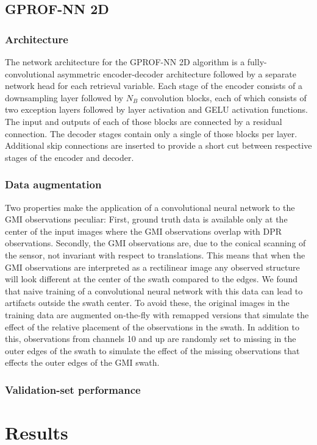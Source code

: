 \documentclass[a4paper,11pt,bibtotoc]{scrartcl}
\begin{document}
\subsection{GPROF-NN 2D}

\subsubsection{Architecture}

The network architecture for the GPROF-NN 2D algorithm is a fully-convolutional
asymmetric encoder-decoder architecture followed by a separate network head for
each retrieval variable. Each stage of the encoder consists of a downsampling
layer followed by $N_B$ convolution blocks, each of which consists of two
exception layers followed by layer activation and GELU activation functions. The
input and outputs of each of those blocks are connected by a residual
connection. The decoder stages contain only a single of those blocks per layer.
Additional skip connections are inserted to provide a short cut between
respective stages of the encoder and decoder.

\subsubsection{Data augmentation}

Two properties make the application of a convolutional neural network to the GMI
observations peculiar: First, ground truth data is available only at the center
of the input images where the GMI observations overlap with DPR observations.
Secondly, the GMI observations are, due to the conical scanning of the sensor,
not invariant with respect to translations. This means that when the GMI
observations are interpreted as a rectilinear image any observed structure will
look different at the center of the swath compared to the edges. We found that
naive training of a convolutional neural network with this data can lead to
artifacts outside the swath center. To avoid these, the original images in the
training data are augmented on-the-fly with remapped versions that simulate the
effect of the relative placement of the observations in the swath. In addition
to this, observations from channels 10 and up are randomly set to missing in the
outer edges of the swath to simulate the effect of the missing observations that
effects the outer edges of the GMI swath.



\subsubsection{Validation-set performance}


\section{Results}



\end{document}
